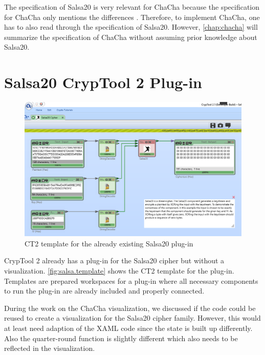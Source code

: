 The specification of Salsa20 is very relevant for ChaCha because the specification for ChaCha only mentions the differences \cite{chachaspec}. Therefore, to implement ChaCha, one has to also read through the specification of Salsa20.  However, \autoref{chap:chacha} will summarize the specification of ChaCha without assuming prior knowledge about Salsa20.


\section{Salsa20 CrypTool 2 Plug-in}
\label{sec:salsaCT2Plugin}

\begin{figure}
\centering
\includegraphics[width=\textwidth]{figures/ct2/salsa-crop.png}
\caption[Salsa20 CT2 template]{CT2 template for the already existing Salsa20 plug-in}
\label{fig:salsa.template}
\end{figure}

CrypTool 2 already has a plug-in for the Salsa20 cipher but without a visualization. \autoref{fig:salsa.template} shows the CT2 template for the plug-in. Templates are prepared workspaces for a plug-in where all necessary components to run the plug-in are already included and properly connected.

During the work on the ChaCha visualization, we discussed if the code could be reused to create a visualization for the Salsa20 cipher family. However, this would at least need adaption of the XAML code since the state is built up differently. Also the quarter-round function is slightly different which also needs to be reflected in the visualization.

